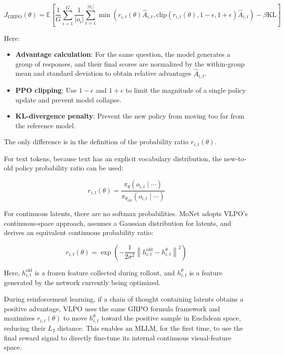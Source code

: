 \[
J_{\text{GRPO}}(\theta) =
\mathbb{E}\left[
\frac{1}{G}\sum_{i=1}^{G}\frac{1}{|o_i|}
\sum_{t=1}^{|o_i|}
\min\left(
r_{i,t}(\theta)\hat A_{i,t},
\mathrm{clip}(r_{i,t}(\theta),1-\epsilon,1+\epsilon)\hat A_{i,t}
\right)
-\beta\mathrm{KL}
\right]
\]

Here:

\begin{itemize}
\tightlist
\item
  \textbf{Advantage calculation}: For the same question, the model generates a group of responses, and their final scores are normalized by the within-group mean and standard deviation to obtain relative advantages \(\hat A_{i,t}\).
\item
  \textbf{PPO clipping}: Use \(1-\epsilon\) and \(1+\epsilon\) to limit the magnitude of a single policy update and prevent model collapse.
\item
  \textbf{KL-divergence penalty}: Prevent the new policy from moving too far from the reference model.
\end{itemize}

The only difference is in the definition of the probability ratio \(r_{i,t}(\theta)\).

For text tokens, because text has an explicit vocabulary distribution, the new-to-old policy probability ratio can be used:

\[
r_{i,t}(\theta) =
\frac{\pi_{\theta}(o_{i,t}\mid\cdots)}
{\pi_{\theta_{\text{old}}}(o_{i,t}\mid\cdots)}
\]

For continuous latents, there are no softmax probabilities. MoNet adopts VLPO's continuous-space approach, assumes a Gaussian distribution for latents, and derives an equivalent continuous probability ratio:

\[
r_{i,t}(\theta) =
\exp\left(
-\frac{1}{2\sigma^2}
\left\lVert h_{i,t}^{\text{old}}-h_{i,t}^{\theta}\right\rVert^2
\right)
\]

Here, \(h_{i,t}^{\text{old}}\) is a frozen feature collected during rollout, and \(h_{i,t}^{\theta}\) is a feature generated by the network currently being optimized.

During reinforcement learning, if a chain of thought containing latents obtains a positive advantage, VLPO uses the same GRPO formula framework and maximizes \(r_{i,t}(\theta)\) to move \(h_{i,t}^{\theta}\) toward the positive sample in Euclidean space, reducing their \(L_2\) distance. This enables an MLLM, for the first time, to use the final reward signal to directly fine-tune its internal continuous visual-feature space.

